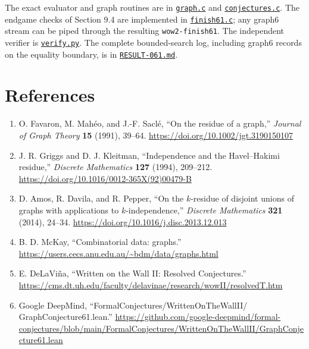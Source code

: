 \documentclass[
  11pt,
  letterpaper,
]{article}
\providecommand{\tightlist}{%
  \setlength{\itemsep}{0pt}\setlength{\parskip}{0pt}}
\begin{document}
The exact evaluator and graph routines are in
\href{graph.c}{\texttt{graph.c}} and
\href{conjectures.c}{\texttt{conjectures.c}}. The endgame checks of
Section 9.4 are implemented in \href{finish61.c}{\texttt{finish61.c}};
any graph6 stream can be piped through the resulting
\texttt{wow2-finish61}. The independent verifier is
\href{verify.py}{\texttt{verify.py}}. The complete bounded-search log,
including graph6 records on the equality boundary, is in
\href{RESULT-061.md}{\texttt{RESULT-061.md}}.

\section{References}\label{references}

\begin{enumerate}
\def\labelenumi{\arabic{enumi}.}
\tightlist
\item
  O. Favaron, M. Mahéo, and J.-F. Saclé, ``On the residue of a graph,''
  \emph{Journal of Graph Theory} \textbf{15} (1991), 39--64.
  \url{https://doi.org/10.1002/jgt.3190150107}
\item
  J. R. Griggs and D. J. Kleitman, ``Independence and the Havel--Hakimi
  residue,'' \emph{Discrete Mathematics} \textbf{127} (1994), 209--212.
  \url{https://doi.org/10.1016/0012-365X(92)00479-B}
\item
  D. Amos, R. Davila, and R. Pepper, ``On the \(k\)-residue of disjoint
  unions of graphs with applications to \(k\)-independence,''
  \emph{Discrete Mathematics} \textbf{321} (2014), 24--34.
  \url{https://doi.org/10.1016/j.disc.2013.12.013}
\item
  B. D. McKay, ``Combinatorial data: graphs.''
  \url{https://users.cecs.anu.edu.au/~bdm/data/graphs.html}
\item
  E. DeLaViña, ``Written on the Wall II: Resolved Conjectures.''
  \url{https://cms.dt.uh.edu/faculty/delavinae/research/wowII/resolvedT.htm}
\item
  Google DeepMind, ``FormalConjectures/WrittenOnTheWallII/
  GraphConjecture61.lean.''
  \url{https://github.com/google-deepmind/formal-conjectures/blob/main/FormalConjectures/WrittenOnTheWallII/GraphConjecture61.lean}
\end{enumerate}
\end{document}
